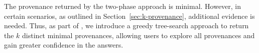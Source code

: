 

The provenance returned by the two-phase approach
is minimal. However, 
in certain scenarios, as outlined in Section~\ref{sec:k-provenance}, additional evidence is needed. 
Thus, as part of \sys, we introduce a 
greedy tree-search approach 
to return the $k$ distinct 
minimal provenances, 
allowing users to explore all provenances and gain greater confidence in the answers. 








 